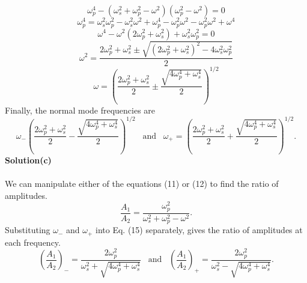 \documentclass[12pt,a4paper]{article}
\begin{document}
\[\omega_p^4-\left(\omega_s^2+\omega_p^2-\omega^2\right)\left(\omega_p^2-\omega^2\right)=0\]
\[\omega_p^4=\omega_s^2\omega_p^2-\omega_s^2\omega^2+\omega_p^4-\omega_p^2\omega^2-\omega_p^2\omega^2+\omega^4\]
\[\omega^4-\omega^2\left(2\omega_p^2+\omega_s^2\right)+\omega_s^2\omega_p^2=0\]
\[\omega^2=\frac{2\omega_p^2+\omega_s^2\pm\sqrt{\left(2\omega_p^2+\omega_s^2\right)^2-4\omega_s^2\omega_p^2}}{2}\]
\[\omega=\left(\frac{2\omega_p^2+\omega_s^2}{2}\pm\frac{\sqrt{4\omega_p^4+\omega_s^4}}{2}\right)^{1/2}\]
Finally, the normal mode frequencies are
\begin{equation}
    \omega_-\left(\frac{2\omega_p^2+\omega_s^2}{2}-\frac{\sqrt{4\omega_p^4+\omega_s^4}}{2}\right)^{1/2}\,\,\,\,\,\text{and}\,\,\,\,\,\omega_+=\left(\frac{2\omega_p^2+\omega_s^2}{2}+\frac{\sqrt{4\omega_p^4+\omega_s^4}}{2}\right)^{1/2}.
\end{equation}
\textbf{Solution(c)}
\\
\\We can manipulate either of the equations (11) or (12) to find the ratio of amplitudes.
\begin{equation}
    \frac{A_1}{A_2}=\frac{\omega_p^2}{\omega_s^2+\omega_p^2-\omega^2}.
\end{equation}
Substituting $\omega_-$ and $\omega_+$ into Eq. (15) separately, gives the ratio of amplitudes at each frequency. 
\[\left(\frac{A_1}{A_2}\right)_-=\frac{2\omega_p^2}{\omega_s^2+\sqrt{4\omega_p^4+\omega_s^4}}\,\,\,\,\,\text{and}\,\,\,\,\,\left(\frac{A_1}{A_2}\right)_+=\frac{2\omega_p^2}{\omega_s^2-\sqrt{4\omega_p^4+\omega_s^4}}.\]
\end{document}
